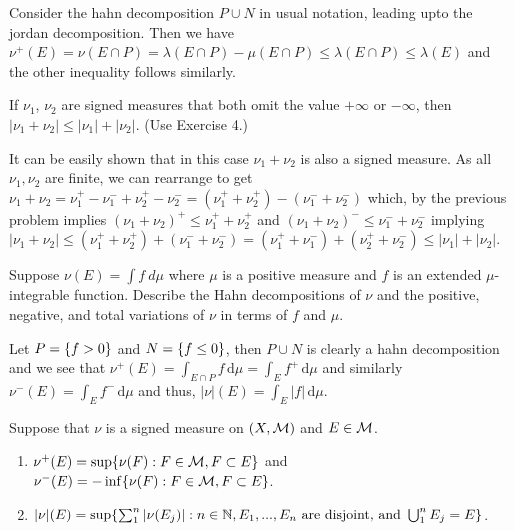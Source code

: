 \documentclass[12pt,a4paper]{article}
\begin{document}
\begin{solution}
Consider the hahn decomposition $P\cup N$ in usual notation, leading upto the jordan decomposition. 
Then we have $\nu^+(E)=\nu(E\cap P)=\lambda(E\cap P)-\mu(E\cap P)\leq\lambda(E\cap P)\leq\lambda(E)$ and the other inequality follows similarly. 
\end{solution}
\begin{problem}\label{prob:3-5}
If $\nu_{1}$, $\nu_{2}$ are signed measures that both omit the value $+\infty$ or $-\infty$, then $|\nu_{1}+\nu_{2}|\le|\nu_{1}|+|\nu_{2}|$. (Use Exercise 4.)
\end{problem}
\begin{solution}
It can be easily shown that in this case $\nu_1+\nu_2$ is also a signed measure. 
As all $\nu_1,\nu_2$ are finite, we can rearrange to get $\nu_1+\nu_2=\nu_1^+-\nu_1^-+\nu_2^+-\nu_2^-=(\nu_1^++\nu_2^+)-(\nu_1^-+\nu_2^-)$ which, by the previous problem implies $(\nu_1+\nu_2)^+\leq\nu_1^++\nu_2^+$ and $(\nu_1+\nu_2)^-\leq\nu_1^-+\nu_2^-$ implying $|\nu_1+\nu_2|\leq(\nu_1^++\nu_2^+)+(\nu_1^-+\nu_2^-)=(\nu_1^++\nu_1^-)+(\nu_2^++\nu_2^-)\leq|\nu_1|+|\nu_2|$.
\end{solution}
\begin{problem}\label{prob:3-6}
Suppose $\nu(E)=\int f~d\mu$ where $\mu$ is a positive measure and $f$ is an extended $\mu$-integrable function. Describe the Hahn decompositions of $\nu$ and the positive, negative, and total variations of $\nu$ in terms of $f$ and $\mu$.
\end{problem}
\begin{solution}
	Let $P= \qty{f>0}$ and $N= \qty{f\leq 0}$, then $P\cup N$ is clearly a hahn decomposition and we see that $\nu^+(E)= \int_{E\cap P}^{}f\,\mathrm{d}\mu= \int_{E}^{}f^+\,\mathrm{d}\mu$ and similarly $\nu^-(E)= \int_{E}^{}f^-\,\mathrm{d}\mu$ and thus, $|\nu|(E)= \int_{E}^{}|f|\,\mathrm{d}\mu$.
\end{solution}
\begin{problem}\label{prob:3-7}
Suppose that $\nu$ is a signed measure on $(X, \mathcal{M})$ and $E\in\mathcal{M}$.
\begin{enumerate}[label=\alph*.]
    \item $\nu^{+}(E)=\sup\{\nu(F):F\in\mathcal{M},F\subset E\}$ and $\nu^{-}(E)=-\inf\{\nu(F):F\in\mathcal{M}, F\subset E\}$.
    \item $|\nu|(E)=\sup\{\sum_{1}^{n}|\nu(E_{j})|:n\in\mathbb{N},E_{1},...,E_{n} \text{ are disjoint, and } \bigcup_{1}^{n}E_{j}=E\}$.
\end{enumerate}
\end{problem}
\end{document}
